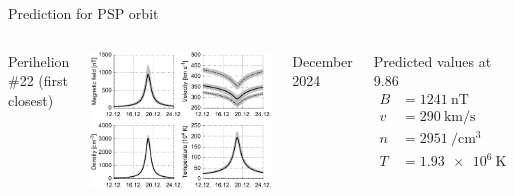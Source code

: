 \begin{frame}[plain,c]{Prediction for PSP orbit}{}
	\begin{columns}[c]
		
		\centering
		Perihelion \#22 (first closest)\\\ 
		
		\includegraphics[width=\textwidth]{../figures_paper/SPP_perihelia_prediction_nearest_f_plot.pdf}
		
		December 2024
		
		
		\begin{block}{\centering Predicted values at 9.86\,\Rs}
			\begin{align*}
				B &= \SI{1241}{\nano\tesla}\\
				v &= \SI{290}{\km\per\s}\\
				n &= \SI{2951}{\per\cm\cubed}\\
				T &= \SI{1.93e6}{\kelvin}
			\end{align*}
		\end{block}
		
	\end{columns}
\end{frame}
